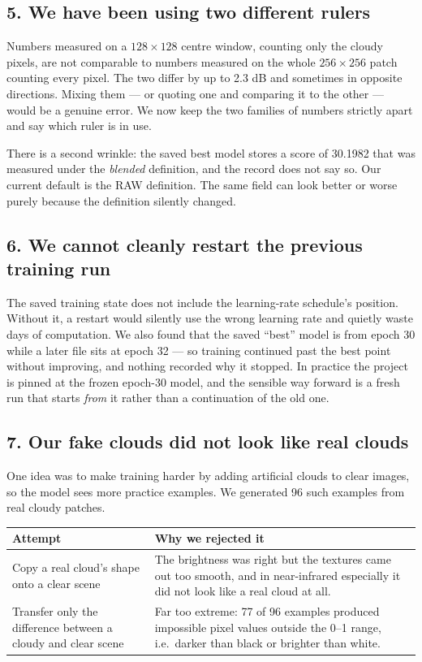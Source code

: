 \documentclass[11pt,a4paper]{article}
\begin{document}
\subsection{5. We have been using two different rulers}
\label{sec:ruler}

Numbers measured on a $128 \times 128$ centre window, counting only the cloudy pixels, are not
comparable to numbers measured on the whole $256 \times 256$ patch counting every pixel. The two
differ by up to 2.3 dB and sometimes in opposite directions. Mixing them --- or quoting one and
comparing it to the other --- would be a genuine error. We now keep the two families of numbers
strictly apart and say which ruler is in use.

There is a second wrinkle: the saved best model stores a score of 30.1982 that was measured under
the \emph{blended} definition, and the record does not say so. Our current default is the RAW
definition. The same field can look better or worse purely because the definition silently changed.

\subsection{6. We cannot cleanly restart the previous training run}

The saved training state does not include the learning-rate schedule's position. Without it, a
restart would silently use the wrong learning rate and quietly waste days of computation. We also
found that the saved ``best'' model is from epoch 30 while a later file sits at epoch 32 --- so
training continued past the best point without improving, and nothing recorded why it stopped. In
practice the project is pinned at the frozen epoch-30 model, and the sensible way forward is a fresh
run that starts \emph{from} it rather than a continuation of the old one.

\subsection{7. Our fake clouds did not look like real clouds}

One idea was to make training harder by adding artificial clouds to clear images, so the model sees
more practice examples. We generated 96 such examples from real cloudy patches.

\begin{center}
\begin{tabular}{@{}lp{8.4cm}@{}}
\hline
\textbf{Attempt} & \textbf{Why we rejected it} \\
\hline
Copy a real cloud's shape onto a clear scene & The brightness was right but the textures came out too smooth, and in near-infrared especially it did not look like a real cloud at all. \\
\hline
Transfer only the difference between a cloudy and clear scene & Far too extreme: 77 of 96 examples produced impossible pixel values outside the 0--1 range, i.e.\ darker than black or brighter than white. \\
\hline
\end{tabular}
\end{center}
\end{document}
